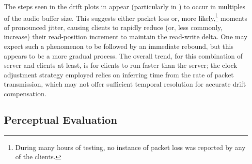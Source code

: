 The steps seen in the drift plots in
 appear (particularly in
) to occur in multiples of the audio buffer size.
This suggests either packet loss or, more likely,\footnote{
    During many hours of testing, no instance of packet loss was reported by any
    of the clients.
} moments of pronounced jitter, causing
clients to rapidly reduce (or, less commonly, increase) their read-position
increment to maintain the read-write delta.
One may expect such a phenomenon to be followed by an immediate rebound, but
this appears to be a more gradual process.
The overall trend, for this combination of server and clients at least, is for
clients to run faster than the server;
the clock adjustment strategy employed relies on inferring time from the rate of
packet transmission, which may not offer sufficient temporal resolution for
accurate drift compensation.

\subsection{Perceptual Evaluation}\label{subsec:perceptual-evaluation}

